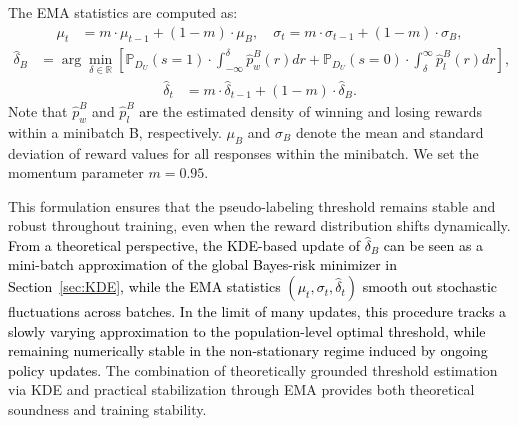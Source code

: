 \documentclass{article} %
\newcommand\rebuttal[1]{\textcolor{black}{#1}}
\begin{document}
The EMA statistics are computed as:
\begin{align*}
   \mu_t &= m \cdot \mu_{t-1} + (1 - m) \cdot \mu_B, \quad  \sigma_t = m \cdot \sigma_{t-1} + (1 - m) \cdot \sigma_B,
\end{align*}
\begin{align*}
   \hat{\delta}_B &= \arg\min_{\delta \in \mathbb{R}} \left[ \mathbb{P}_{D_U}(s = 1) \cdot \int_{-\infty}^{\delta} \hat{p}_w^B(r) dr \right. + \left. \mathbb{P}_{D_U}(s = 0) \cdot \int_{\delta}^{\infty} \hat{p}_l^B(r) dr\right],
\end{align*}
\begin{align*}
   \hat{\delta}_t &= m \cdot \hat{\delta}_{t-1}+ (1-m) \cdot \hat{\delta}_B.
\end{align*}
Note that $\hat{p}_w^B$ and $\hat{p}_l^B$ \rebuttal{are} the estimated density of winning and losing rewards within a minibatch B, respectively. $\mu_B$ and $\sigma_B$ denote the mean and standard deviation of reward values for all responses within the minibatch. We set the momentum parameter $m = 0.95$.

This formulation ensures that the pseudo-labeling threshold remains stable and robust throughout training, even when the reward distribution shifts dynamically. \rebuttal{From a theoretical perspective, the KDE-based update of $\hat{\delta}_B$ can be seen as a mini-batch approximation of the global Bayes-risk minimizer in Section~\ref{sec:KDE}, while the EMA statistics $(\mu_t,\sigma_t,\hat{\delta}_t)$ smooth out stochastic fluctuations across batches. In the limit of many updates, this procedure tracks a slowly varying approximation to the population-level optimal threshold, while remaining numerically stable in the non-stationary regime induced by ongoing policy updates.} The combination of theoretically grounded threshold estimation via KDE and practical stabilization through EMA provides both theoretical soundness and training stability.
\end{document}
